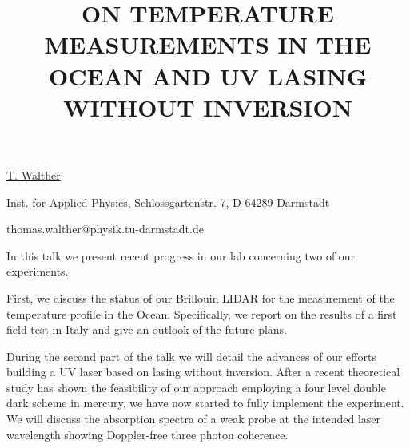 \title{ON TEMPERATURE MEASUREMENTS IN THE OCEAN AND UV LASING WITHOUT INVERSION}

\underline{T. Walther} 

{\normalsize{\vspace{-4mm}
Inst. for Applied Physics,
Schlossgartenstr. 7,
D-64289 Darmstadt

\email thomas.walther@physik.tu-darmstadt.de}}

In this talk we present recent progress in our lab concerning two of our experiments.

First, we discuss the status of our Brillouin LIDAR for the measurement of the temperature profile in the Ocean.
Specifically, we report on the results of a first field test in Italy and give an outlook of the future plans.

During the second part of the talk we will detail the advances of our efforts building a UV laser based on lasing without inversion. After a
recent theoretical study has shown the feasibility of our approach employing a four level double dark scheme  in
mercury, we have now started to fully implement the experiment. We will discuss the absorption spectra of a weak probe
at the intended laser wavelength showing Doppler-free three photon coherence. 

%
%



\vspace{\baselineskip} 